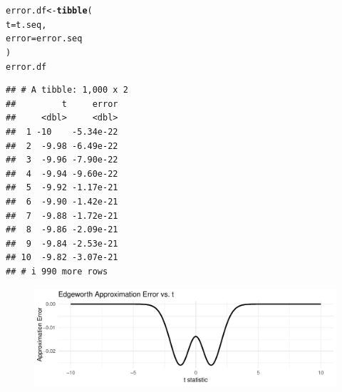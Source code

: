 \documentclass{article}\usepackage[]{graphicx}\usepackage[]{xcolor}
\makeatletter
\newcommand{\hldef}[1]{\textcolor[rgb]{0.345,0.345,0.345}{#1}}%
\newcommand{\hlkwb}[1]{\textcolor[rgb]{0.69,0.353,0.396}{#1}}%
\newcommand{\hlkwc}[1]{\textcolor[rgb]{0.333,0.667,0.333}{#1}}%
\newcommand{\hlkwd}[1]{\textcolor[rgb]{0.737,0.353,0.396}{\textbf{#1}}}%
\newenvironment{kframe}{%
 \def\at@end@of@kframe{}%
 \ifinner\ifhmode%
  \def\at@end@of@kframe{\end{minipage}}%
  \begin{minipage}{\columnwidth}%
 \fi\fi%
 \def\FrameCommand##1{\hskip\@totalleftmargin \hskip-\fboxsep
 \colorbox{shadecolor}{##1}\hskip-\fboxsep
     \hskip-\linewidth \hskip-\@totalleftmargin \hskip\columnwidth}%
 \MakeFramed {\advance\hsize-\width
   \@totalleftmargin\z@ \linewidth\hsize
   \@setminipage}}%
 {\par\unskip\endMakeFramed%
 \at@end@of@kframe}
\newenvironment{knitrout}{}{} %
\makeatother
\begin{document}
\begin{enumerate}
\begin{enumerate}
\begin{knitrout}
\begin{kframe}
\begin{alltt}
\hldef{error.df} \hlkwb{<-} \hlkwd{tibble}\hldef{(}
\hlkwc{t}     \hldef{= t.seq,}
\hlkwc{error} \hldef{= error.seq}
\hldef{)}
\hldef{error.df}
\end{alltt}
\begin{verbatim}
## # A tibble: 1,000 x 2
##         t     error
##     <dbl>     <dbl>
##  1 -10    -5.34e-22
##  2  -9.98 -6.49e-22
##  3  -9.96 -7.90e-22
##  4  -9.94 -9.60e-22
##  5  -9.92 -1.17e-21
##  6  -9.90 -1.42e-21
##  7  -9.88 -1.72e-21
##  8  -9.86 -2.09e-21
##  9  -9.84 -2.53e-21
## 10  -9.82 -3.07e-21
## # i 990 more rows
\end{verbatim}
\end{kframe}
\end{knitrout}
\begin{figure}[H]
\begin{center}
\includegraphics[scale=0.7]{errorplot.pdf}
\label{plot1}
\end{center}
\end{figure}


\end{enumerate}
\end{enumerate}
\end{document}
